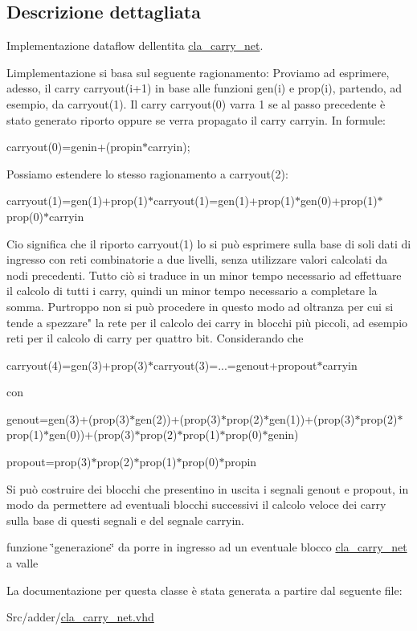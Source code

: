 \subsection{Descrizione dettagliata}
Implementazione dataflow dell\textquotesingle{}entita\textquotesingle{} \hyperlink{classcla__carry__net}{cla\+\_\+carry\+\_\+net}.

L\textquotesingle{}implementazione si basa sul seguente ragionamento\+: Proviamo ad esprimere, adesso, il carry carryout(i+1) in base alle funzioni gen(i) e prop(i), partendo, ad esempio, da carryout(1). Il carry carryout(0) varra\textquotesingle{} 1 se al passo precedente è stato generato riporto oppure se verra\textquotesingle{} propagato il carry carryin. In formule\+: \begin{center}carryout(0)=genin+(propin$\ast$carryin);\end{center}  Possiamo estendere lo stesso ragionamento a carryout(2)\+: \begin{center}carryout(1)=gen(1)+prop(1)$\ast$carryout(1)=gen(1)+prop(1)$\ast$gen(0)+prop(1)$\ast$prop(0)$\ast$carryin\end{center}  Cio\textquotesingle{} significa che il riporto carryout(1) lo si può esprimere sulla base di soli dati di ingresso con reti combinatorie a due livelli, senza utilizzare valori calcolati da nodi precedenti. Tutto ciò si traduce in un minor tempo necessario ad effettuare il calcolo di tutti i carry, quindi un minor tempo necessario a completare la somma. Purtroppo non si può procedere in questo modo ad oltranza per cui si tende a spezzare" la rete per il calcolo dei carry in blocchi più piccoli, ad esempio reti per il calcolo di carry per quattro bit. Considerando che \begin{center}carryout(4)=gen(3)+prop(3)$\ast$carryout(3)=...=genout+propout$\ast$carryin\end{center}  con \begin{center}genout=gen(3)+(prop(3)$\ast$gen(2))+(prop(3)$\ast$prop(2)$\ast$gen(1))+(prop(3)$\ast$prop(2)$\ast$prop(1)$\ast$gen(0))+(prop(3)$\ast$prop(2)$\ast$prop(1)$\ast$prop(0)$\ast$genin)\end{center}  \begin{center}propout=prop(3)$\ast$prop(2)$\ast$prop(1)$\ast$prop(0)$\ast$propin\end{center}  Si può costruire dei blocchi che presentino in uscita i segnali genout e propout, in modo da permettere ad eventuali blocchi successivi il calcolo veloce dei carry sulla base di questi segnali e del segnale carryin. 

funzione \char`\"{}generazione\char`\"{} da porre in ingresso ad un eventuale blocco \hyperlink{classcla__carry__net}{cla\+\_\+carry\+\_\+net} a valle 

La documentazione per questa classe è stata generata a partire dal seguente file\+:\begin{DoxyCompactItemize}
\item 
Src/adder/\hyperlink{cla__carry__net_8vhd}{cla\+\_\+carry\+\_\+net.\+vhd}\end{DoxyCompactItemize}
